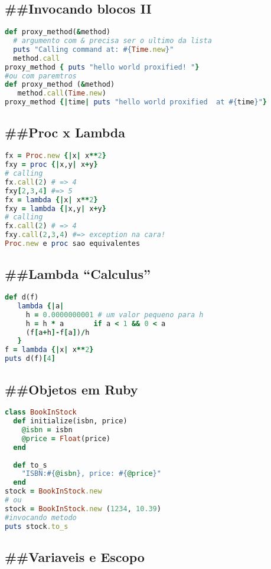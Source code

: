 \documentclass[serif,mathserif]{article}
\begin{document}
\subsection{\#\#Invocando blocos II}
\begin{lstlisting}[language=ruby]
def proxy_method(&method)
  # argumento com & precisa ser o ultimo da lista
  puts "Calling command at: #{Time.new}"
  method.call
proxy_method { puts "hello world proxified! "}
#ou com paremtros
def proxy_method (&method)
   method.call(Time.new)
proxy_method {|time| puts "hello world proxified  at #{time}"}
\end{lstlisting}

\subsection{\#\#Proc x Lambda}
\begin{lstlisting}[language=ruby]
fx = Proc.new {|x| x**2}
fxy = proc {|x,y| x+y}
# calling
fx.call(2) # => 4
fxy[2,3,4] #=> 5
fx = lambda {|x| x**2}
fxy = lambda {|x,y| x+y}
# calling
fx.call(2) # => 4
fxy.call(2,3,4) #=> exception na cara!
Proc.new e proc sao equivalentes
\end{lstlisting}


\subsection{\#\#Lambda ``Calculus''}

\begin{lstlisting}[language=ruby, caption="Derivada em Ruby"]
def d(f)
   lambda {|a|
     h = 0.0000000001 # um valor pequeno para h
     h = h * a       if a < 1 && 0 < a
     (f[a+h]-f[a])/h
   }
f = lambda {|x| x**2}
puts d(f)[4]
\end{lstlisting}

\subsection{\#\#Objetos em Ruby}
\begin{lstlisting}[language=ruby]
class BookInStock
  def initialize(isbn, price)
    @isbn = isbn
    @price = Float(price)
  end
 
  def to_s
    "ISBN:#{@isbn}, price: #{@price}"
  end 
stock = BookInStock.new
# ou
stock = BookInStock.new (1234, 10.39)
#invocando metodo
puts stock.to_s
\end{lstlisting}


\subsection{\#\#Variaveis e Escopo}
\end{document}
